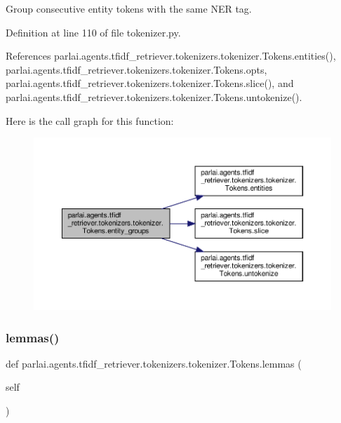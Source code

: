 \begin{DoxyVerb}Group consecutive entity tokens with the same NER tag.\end{DoxyVerb}
 

Definition at line 110 of file tokenizer.\+py.



References parlai.\+agents.\+tfidf\+\_\+retriever.\+tokenizers.\+tokenizer.\+Tokens.\+entities(), parlai.\+agents.\+tfidf\+\_\+retriever.\+tokenizers.\+tokenizer.\+Tokens.\+opts, parlai.\+agents.\+tfidf\+\_\+retriever.\+tokenizers.\+tokenizer.\+Tokens.\+slice(), and parlai.\+agents.\+tfidf\+\_\+retriever.\+tokenizers.\+tokenizer.\+Tokens.\+untokenize().

Here is the call graph for this function\+:
\nopagebreak
\begin{figure}[H]
\begin{center}
\leavevmode
\includegraphics[width=350pt]{classparlai_1_1agents_1_1tfidf__retriever_1_1tokenizers_1_1tokenizer_1_1Tokens_af76da989bcd6090398f0e63b8c30de22_cgraph}
\end{center}
\end{figure}
\mbox{\label{classparlai_1_1agents_1_1tfidf__retriever_1_1tokenizers_1_1tokenizer_1_1Tokens_acc0353a15e5585dae3bd08943b9abe0c}} 
\subsubsection{\texorpdfstring{lemmas()}{lemmas()}}
{\footnotesize\ttfamily def parlai.\+agents.\+tfidf\+\_\+retriever.\+tokenizers.\+tokenizer.\+Tokens.\+lemmas (\begin{DoxyParamCaption}\item[{}]{self }\end{DoxyParamCaption})}

